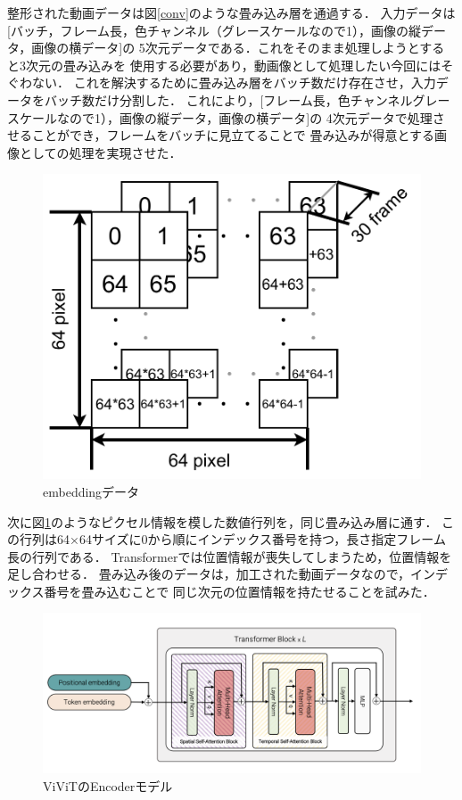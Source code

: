 整形された動画データは図\ref{conv}のような畳み込み層を通過する．
入力データは[バッチ，フレーム長，色チャンネル（グレースケールなので1），画像の縦データ，画像の横データ]の
5次元データである．これをそのまま処理しようとすると3次元の畳み込みを
使用する必要があり，動画像として処理したい今回にはそぐわない．
これを解決するために畳み込み層をバッチ数だけ存在させ，入力データをバッチ数だけ分割した．
これにより，[フレーム長，色チャンネルグレースケールなので1），画像の縦データ，画像の横データ]の
4次元データで処理させることができ，フレームをバッチに見立てることで
畳み込みが得意とする画像としての処理を実現させた．
\clearpage

\begin{figure}[t]
  \begin{center}
    \includegraphics[width=120mm]{images/chart/embedding.pdf}
  \end{center}
  \caption{embeddingデータ}
  \label{embedding}
\end{figure}

次に図\ref{embedding}のようなピクセル情報を模した数値行列を，同じ畳み込み層に通す．
この行列は64×64サイズに0から順にインデックス番号を持つ，長さ指定フレーム長の行列である．
Transformerでは位置情報が喪失してしまうため，位置情報を足し合わせる．
畳み込み後のデータは，加工された動画データなので，インデックス番号を畳み込むことで
同じ次元の位置情報を持たせることを試みた．
\clearpage

\begin{figure}[t]
  \begin{center}
    \includegraphics[width=130mm]{images/quote/encoder.png}
  \end{center}
  \caption{ViViTのEncoderモデル}
  \label{encoder}
\end{figure}

